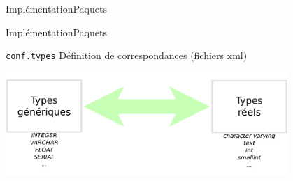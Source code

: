 \begin{frame}{Implémentation}{Paquets}
\begin{center}
\end{center}
\end{frame}

\begin{frame}{Implémentation}{Paquets}
	\begin{block}{\texttt{conf.types}}
	Définition de correspondances (fichiers xml)
	\begin{center}
		\includegraphics[width=0.8\textwidth]{files/generic_types}	
	\end{center}
	\end{block}
\end{frame}

